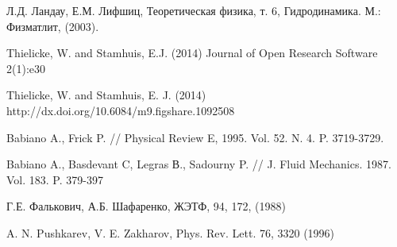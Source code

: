 \begin{thebibliography}{99}


Л.Д. Ландау, Е.М. Лифшиц, Теоретическая физика, т. 6, Гидродинамика. М.: Физматлит, (2003).

Thielicke, W. and Stamhuis, E.J. (2014)
Journal of Open Research Software 2(1):e30

Thielicke, W. and Stamhuis, E. J. (2014)
http://dx.doi.org/10.6084/m9.figshare.1092508 

Babiano A., Frick P.
// Physical Review E, 1995. Vol. 52. N. 4. P. 3719-3729. 

Babiano A., Basdevant C, Legras В., Sadourny P.
// J. Fluid Mechanics. 1987. Vol. 183. P. 379-397


Г.Е. Фалькович, А.Б. Шафаренко, ЖЭТФ, 94, 172, (1988)

A. N. Pushkarev, V. E. Zakharov, Phys. Rev. Lett. 76, 3320 (1996)




\end{thebibliography}
